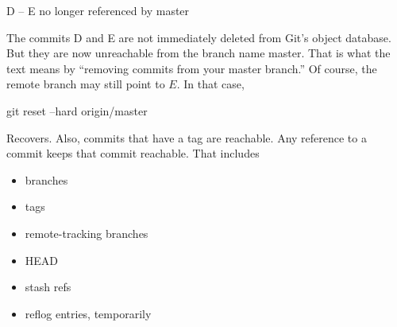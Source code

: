 \documentclass{report}
\begin{document}
\begin{itemize}
\begin{cppcode}
                D -- E    no longer referenced by master
            \end{cppcode}
            \bigbreak \noindent 
            The commits D and E are not immediately deleted from Git’s object database. But they are now unreachable from the branch name master. That is what the text means by “removing commits from your master branch.”
            \bigbreak \noindent 
            Of course, the remote branch may still point to $E$. In that case,
            \bigbreak \noindent 
            \begin{bashcode}
                git reset --hard origin/master
            \end{bashcode}
            \bigbreak \noindent 
            Recovers. Also, commits that have a tag are reachable. Any reference to a commit keeps that commit reachable. That includes
            \bigbreak \noindent 
            \begin{itemize}
                \item branches
                \item tags
                \item remote-tracking branches
                \item HEAD
                \item stash refs
                \item reflog entries, temporarily
            \end{itemize}
    \end{itemize}
\end{document}
